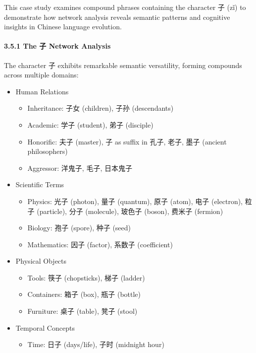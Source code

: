 \documentclass[
  11pt,
  letterpaper,
]{article}
\providecommand{\tightlist}{%
  \setlength{\itemsep}{0pt}\setlength{\parskip}{0pt}}
\begin{document}
This case study examines compound phrases containing the character 子
(zǐ) to demonstrate how network analysis reveals semantic patterns and
cognitive insights in Chinese language evolution.

\hypertarget{the-ux5b50-network-analysis}{%
\paragraph{3.5.1 The 子 Network
Analysis}\label{the-ux5b50-network-analysis}}

The character 子 exhibits remarkable semantic versatility, forming
compounds across multiple domains:

\begin{itemize}
\tightlist
\item
  Human Relations

  \begin{itemize}
  \item
    Inheritance: 子女 (children), 子孙 (descendants)
  \item
    Academic: 学子 (student), 弟子 (disciple)
  \item
    Honorific: 夫子 (master), 子 as suffix in 孔子, 老子, 墨子 (ancient
    philosophers)
  \item
    Aggressor: 洋鬼子, 毛子, 日本鬼子
  \end{itemize}
\item
  Scientific Terms

  \begin{itemize}
  \item
    Physics: 光子 (photon), 量子 (quantum), 原子 (atom), 电子
    (electron), 粒子 (particle), 分子 (molecule), 玻色子 (boson), 费米子
    (fermion)
  \item
    Biology: 孢子 (spore), 种子 (seed)
  \item
    Mathematics: 因子 (factor), 系数子 (coefficient)
  \end{itemize}
\item
  Physical Objects

  \begin{itemize}
  \item
    Tools: 筷子 (chopsticks), 梯子 (ladder)
  \item
    Containers: 箱子 (box), 瓶子 (bottle)
  \item
    Furniture: 桌子 (table), 凳子 (stool)
  \end{itemize}
\item
  Temporal Concepts

  \begin{itemize}
  \tightlist
  \item
    Time: 日子 (days/life), 子时 (midnight hour)
  \end{itemize}
\end{itemize}
\end{document}
